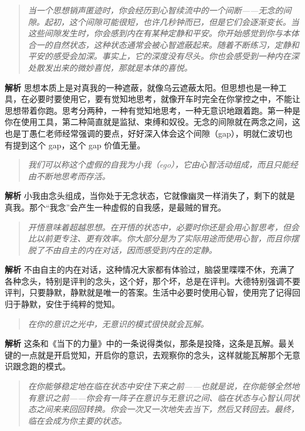 \begin{quote}\it
    当一个思想销声匿迹时，你会经历到心智续流中的一个间断——无念的间隙。起初，这个间隙可能很短，也许几秒钟而已，但是它们会逐渐变长。当这些间隙发生时，你会感到内在有某种定静和平安。你开始感觉到你与本体合一的自然状态，这种状态通常会被心智遮蔽起来。随着不断练习，定静和平安的感受会加深。事实上，它的深度没有尽头。你也会感受到一种内在深处散发出来的微妙喜悦，那就是本体的喜悦。
\end{quote}

\textbf{解析} 思想本质上是对真我的一种遮蔽，就像乌云遮蔽太阳。但思想也是一种工具，在必要时要使用它，要有觉知地思考，就像开车时完全在你掌控之中，不能让思想带着你跑。思考分两种，一种有觉知地思考，一种无意识地跟着跑。第一种是你在使用工具，第二种简直就是监狱、束缚和奴役。无念的间隙就在两念之间，这也是丁愚仁老师经常强调的要点，好好深入体会这个间隙（gap），明就仁波切也有提到这个 gap，这个 gap 价值无量。

\begin{quote}\it
    我们可以称这个虚假的自我为小我（ego），它由心智活动组成，而且只能经由不断地思考而存活。
\end{quote}

\textbf{解析} 小我由念头组成，当你处于无念状态，它就像幽灵一样消失了，剩下的就是真我。那个“我念”会产生一种虚假的自我感，是最贼的冒充。

\begin{quote}\it
    开悟意味着超越思想。在开悟的状态中，必要时你还是会用心智思考，但会比以前更专注、更有效率。你大部分是为了实际用途而使用心智，而且你摆脱了不由自主的内在对话，因而感受到内在的定静。
\end{quote}

\textbf{解析} 不由自主的内在对话，这种情况大家都有体验过，脑袋里喋喋不休，充满了各种念头，特别是评判的念头，这个好，那个坏，总是在评判。大德特别强调不要评判，只要静默，静默就是唯一的答案。生活中必要时使用心智，使用完了记得回归于静默，安住于纯粹的觉知。

\begin{quote}\it
    在你的意识之光中，无意识的模式很快就会瓦解。
\end{quote}

\textbf{解析} 这条和《当下的力量》中的一条说得类似，那条是投降，这条是瓦解。最关键的一点就是开启觉知，开启你的意识，去观察你的念头，这样就能瓦解那个无意识跟念跑的模式。

\begin{quote}\it
    在你能够稳定地在临在状态中安住下来之前——也就是说，在你能够全然地有意识之前——你会有一阵子在意识与无意识之间、临在状态与心智认同状态之间来来回回转换。你会一次又一次地失去当下，然后又转回去。最终，临在会成为你主要的状态。
\end{quote}


